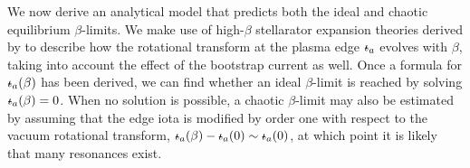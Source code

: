 \documentclass[my_thesis.tex]{subfiles}
\begin{document}

We now derive an analytical model that predicts both the ideal and chaotic equilibrium $\beta$-limits. We make use of high-$\beta$ stellarator expansion theories derived by \citet{wakataniStellaratorHeliotronDevices1998,Freidberg2014} to describe how the rotational transform at the plasma edge $\text{$\iota\!\!$-}_a$ evolves with $\beta$, taking into account the effect of the bootstrap current as well. Once a formula for $\text{$\iota\!\!$-}_a(\beta)$ has been derived, we can find whether an ideal $\beta$-limit is reached by solving $\text{$\iota\!\!$-}_a(\beta)=0$. When no solution is possible, a chaotic $\beta$-limit may also be estimated by assuming that the edge iota is modified by order one with respect to the vacuum rotational transform, $\text{$\iota\!\!$-}_a(\beta)-\text{$\iota\!\!$-}_a(0) \sim \text{$\iota\!\!$-}_a(0)$, at which point it is likely that many resonances exist. 
\end{document}
